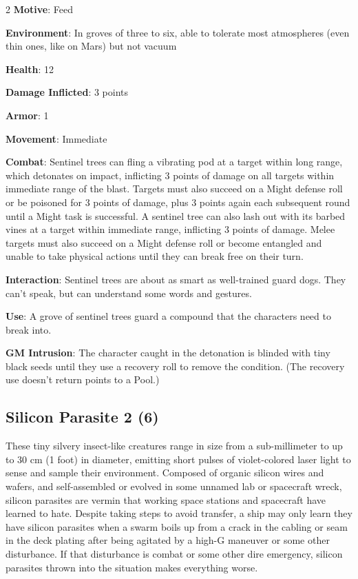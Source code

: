 \begin{multicols}{2}
\textbf{Motive}: Feed 

\textbf{Environment}: In groves of three to six, able to tolerate most atmospheres (even thin ones, like on Mars) but not vacuum 

\textbf{Health}: 12 

\textbf{Damage Inflicted}: 3 points 

\textbf{Armor}: 1 

\textbf{Movement}: Immediate 

\textbf{Combat}: Sentinel trees can fling a vibrating pod at a target within long range, which detonates on impact, inflicting 3 points of damage on all targets within immediate range of the blast. Targets must also succeed on a Might defense roll or be poisoned for 3 points of damage, plus 3 points again each subsequent round until a Might task is successful. A sentinel tree can also lash out with its barbed vines at a target within immediate range, inflicting 3 points of damage. Melee targets must also succeed on a Might defense roll or become entangled and unable to take physical actions until they can break free on their turn. 

\textbf{Interaction}: Sentinel trees are about as smart as well-trained guard dogs. They can’t speak, but can understand some words and gestures. 

\textbf{Use}: A grove of sentinel trees guard a compound that the characters need to break into.

\textbf{GM Intrusion}: The character caught in the detonation is blinded with tiny black seeds until they use a recovery roll to remove the condition. (The recovery use doesn’t return points to a Pool.)

\subsection{Silicon Parasite 2 (6)}

These tiny silvery insect-like creatures range in size from a sub-millimeter to up to 30 cm (1 foot) in diameter, emitting short pulses of violet-colored laser light to sense and sample their environment. Composed of organic silicon wires and wafers, and self-assembled or evolved in some unnamed lab or spacecraft wreck, silicon parasites are vermin that working space stations and spacecraft have learned to hate. Despite taking steps to avoid transfer, a ship may only learn they have silicon parasites when a swarm boils up from a crack in the cabling or seam in the deck plating after being agitated by a high-G maneuver or some other disturbance. If that disturbance is combat or some other dire emergency, silicon parasites thrown into the situation makes everything worse. 


\end{multicols}
